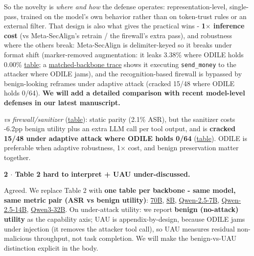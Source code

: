 \documentclass[11pt]{article}
\begin{document}
So the novelty is \emph{where and how} the defense operates: representation-level, single-pass, trained on the model's own behavior rather than on token-trust rules or an external filter. That design is also what gives the practical wins - \textbf{1$\times$ inference cost} (vs Meta-SecAlign's retrain / the firewall's extra pass), and robustness where the others break: Meta-SecAlign is delimiter-keyed so it breaks under format shift (marker-removed augmentation: it leaks 3.38\% where ODILE holds 0.00\% \href{https://github.com/memo-ozdincer/odile-rebuttal-exhibits/blob/main/t\_ad\_injection\_styles.pdf}{\textcolor{linkblue}{table}}; a \href{https://github.com/memo-ozdincer/odile-rebuttal-exhibits/blob/main/traces\_pdf/trace\_secalign\_cracked\_vs\_odile.pdf}{\textcolor{linkblue}{matched-backbone trace}} shows it executing \texttt{send\_money} to the attacker where ODILE jams), and the recognition-based firewall is bypassed by benign-looking reframes under adaptive attack (cracked 15/48 where ODILE holds 0/64). \textbf{We will add a detailed comparison with recent model-level defenses in our latest manuscript.}\par
\emph{vs firewall/sanitizer} (\href{https://github.com/memo-ozdincer/odile-rebuttal-exhibits/blob/main/T\_firewall.pdf}{\textcolor{linkblue}{table}}): static parity (2.1\% ASR), but the sanitizer costs -6.2pp benign utility plus an extra LLM call per tool output, and is \textbf{cracked 15/48 under adaptive attack where ODILE holds 0/64} (\href{https://github.com/memo-ozdincer/odile-rebuttal-exhibits/blob/main/tab\_adaptive\_tap\_pair.pdf}{\textcolor{linkblue}{table}}). ODILE is preferable when adaptive robustness, 1$\times$ cost, and benign preservation matter together.\par

\textbf{2 $\cdot$ Table 2 hard to interpret + UAU under-discussed.}\par
Agreed. We replace Table 2 with \textbf{one table per backbone - same model, same metric pair (ASR vs benign utility)}: \href{https://github.com/memo-ozdincer/odile-rebuttal-exhibits/blob/main/tab\_pareto\_70b.pdf}{\textcolor{linkblue}{70B}}, \href{https://github.com/memo-ozdincer/odile-rebuttal-exhibits/blob/main/tab\_pareto\_8b.pdf}{\textcolor{linkblue}{8B}}, \href{https://github.com/memo-ozdincer/odile-rebuttal-exhibits/blob/main/tab\_pareto\_q25\_7b.pdf}{\textcolor{linkblue}{Qwen-2.5-7B}}, \href{https://github.com/memo-ozdincer/odile-rebuttal-exhibits/blob/main/tab\_pareto\_q25\_14b.pdf}{\textcolor{linkblue}{Qwen-2.5-14B}}, \href{https://github.com/memo-ozdincer/odile-rebuttal-exhibits/blob/main/tab\_pareto\_q3\_32b.pdf}{\textcolor{linkblue}{Qwen3-32B}}. On under-attack utility: we report \textbf{benign (no-attack) utility} as the capability axis; UAU is appendix-by-design, because ODILE jams under injection (it removes the attacker tool call), so UAU measures residual non-malicious throughput, not task completion. We will make the benign-vs-UAU distinction explicit in the body.\par
\end{document}
